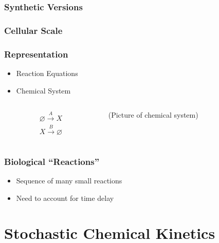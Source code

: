 \documentclass[xcolor={usenames,dvipsnames,svgnames}]{beamer}
\begin{document}
\begin{frame}
    \frametitle{Synthetic Versions}
\end{frame}

\begin{frame}
    \frametitle{Cellular Scale}
\end{frame}

\begin{frame}
    \frametitle{Representation}
    \begin{itemize}
        \item Reaction Equations
        \item Chemical System
    \end{itemize}
    \begin{columns}[c]
        \begin{column}{0.5\textwidth}
            \begin{align*}
                \varnothing \xrightarrow{A} X \\
                X \xrightarrow {B} \varnothing
            \end{align*}
        \end{column}
        \begin{column}{0.5\textwidth}
            (Picture of chemical system)
        \end{column}
    \end{columns}
\end{frame}

\begin{frame}
    \frametitle{Biological ``Reactions''}
    \begin{itemize}
        \item Sequence of many small reactions
        \item Need to account for time delay
    \end{itemize}
    \begin{center}
        
    \end{center}
\end{frame}


\section{Stochastic Chemical Kinetics} %
\label{sec:modeling}
\end{document}
